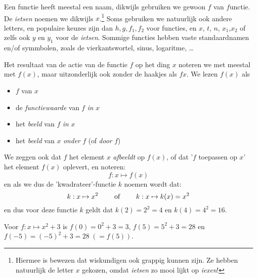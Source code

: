 \documentclass{ximera}
\begin{document}
Een functie heeft meestal een naam, dikwijls gebruiken we gewoon $f$ van $f$unctie. De \textit{ietsen} noemen we dikwijls $x$.\footnote{Hiermee is bewezen dat wiskundigen ook grappig kunnen zijn. Ze hebben natuurlijk de letter $x$ gekozen, omdat \textit{ietsen} zo mooi lijkt op \textit{iexen}!} Soms gebruiken we natuurlijk ook andere letters, en populaire keuzes zijn dan $h,g,f_1, f_2$ voor functies, en $x$, $t$, $n$, $x_1$,$x_2$ of zelfs ook $y$ en $y_1$  voor de \textit{ietsen}. Sommige functies hebben vaste standaardnamen en/of symmbolen, zoals de vierkantswortel, sinus, logaritme, \ldots

Het resultaat van de actie van de functie $f$ op het ding $x$ noteren we met meestal met $f(x)$, maar uitzonderlijk ook zonder de haakjes als $fx$. We lezen $f(x)$ als 
\begin{itemize}
\item $f$ van $x$
\item de \textit{functiewaarde} van $f$ \textit{in} $x$
\item het \textit{beeld} van $f$ \textit{in} $x$
\item het \textit{beeld} van $x$ \textit{onder} $f$ (of \textit{door} $f$)
\end{itemize}
We zeggen ook dat $f$ het element $x$ \textit{afbeeldt} op $f(x)$, of dat '$f$ toepassen op $x$' het element $f(x)$ oplevert, en noteren:
$$
f: x \mapsto f(x) 
$$
en als we dus de 'kwadrateer'-functie $k$ noemen wordt dat:
$$
k: x \mapsto x^2 \text{ \qquad of \qquad }  k: x \mapsto k(x) = x^2
$$
en dus voor deze functie $k$ geldt dat $k(2)=2^2=4$ en $k(4)=4^2=16$. 

Voor $f:x\mapsto x^2+3$ is $f(0)=0^2+3=3$, $f(5)=5^2+3=28$ en $f(-5)=(-5)^2+3=28\;(=f(5))$.

\begin{center}
\end{center}
\end{document}
